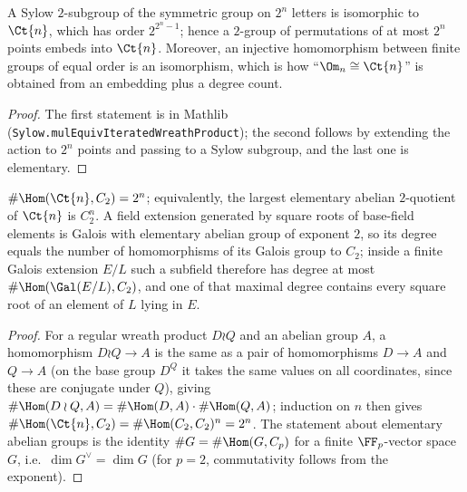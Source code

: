 \begin{lemma}
  \label{lem:sylowwreath}
  \leanok
  A Sylow $2$-subgroup of the symmetric group on $2^n$ letters is isomorphic to $\Ct{n}$, which
  has order $2^{2^n - 1}$; hence a $2$-group of permutations of at most $2^n$ points embeds into
  $\Ct{n}$. Moreover, an injective homomorphism between finite groups of equal order is an
  isomorphism, which is how ``$\Om_n \cong \Ct{n}$'' is obtained from an embedding plus a degree
  count.
\end{lemma}
\begin{proof}
  \leanok
  The first statement is in Mathlib (\texttt{Sylow.mulEquivIteratedWreathProduct}); the second
  follows by extending the action to $2^n$ points and passing to a Sylow subgroup, and the last
  one is elementary.
\end{proof}

\begin{lemma}
  \label{lem:wreathab}
  \leanok
  $\#\Hom(\Ct{n}, C_2) = 2^n$; equivalently, the largest elementary abelian $2$-quotient of
  $\Ct{n}$ is $C_2^n$. A field extension generated by square roots of base-field elements is
  Galois with elementary abelian group of exponent $2$, so its degree equals the number of
  homomorphisms of its Galois group to $C_2$; inside a finite Galois extension $E/L$ such a
  subfield therefore has degree at most $\#\Hom(\Gal(E/L), C_2)$, and one of that maximal degree
  contains every square root of an element of $L$ lying in $E$.
\end{lemma}
\begin{proof}
  \leanok
  For a regular wreath product $D \wr Q$ and an abelian group $A$, a homomorphism $D \wr Q \to A$
  is the same as a pair of homomorphisms $D \to A$ and $Q \to A$ (on the base group $D^Q$ it
  takes the same values on all coordinates, since these are conjugate under $Q$), giving
  $\#\Hom(D \wr Q, A) = \#\Hom(D, A) \cdot \#\Hom(Q, A)$; induction on $n$ then gives
  $\#\Hom(\Ct{n}, C_2) = \#\Hom(C_2, C_2)^n = 2^n$. The statement about elementary abelian
  groups is the identity $\#G = \#\Hom(G, C_p)$ for a finite $\FF_p$-vector space $G$, i.e.\
  $\dim G^{\vee} = \dim G$ (for $p = 2$, commutativity follows from the exponent).
\end{proof}

